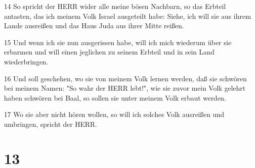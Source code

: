 \par 14 So spricht der HERR wider alle meine bösen Nachbarn, so das Erbteil antasten, das ich meinem Volk Israel ausgeteilt habe: Siehe, ich will sie aus ihrem Lande ausreißen und das Haus Juda aus ihrer Mitte reißen.
\par 15 Und wenn ich sie nun ausgerissen habe, will ich mich wiederum über sie erbarmen und will einen jeglichen zu seinem Erbteil und in sein Land wiederbringen.
\par 16 Und soll geschehen, wo sie von meinem Volk lernen werden, daß sie schwören bei meinem Namen: "So wahr der HERR lebt!", wie sie zuvor mein Volk gelehrt haben schwören bei Baal, so sollen sie unter meinem Volk erbaut werden.
\par 17 Wo sie aber nicht hören wollen, so will ich solches Volk ausreißen und umbringen, spricht der HERR.

\chapter{13}

